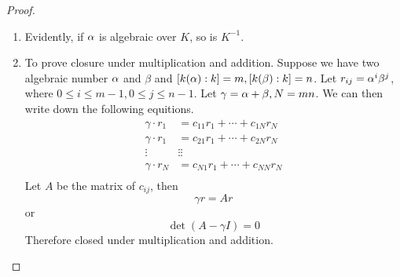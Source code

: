 \begin{proof}\mbox{}
\begin{enumerate}
	\item Evidently, if $\alpha$ is algebraic over $K$, so is $K^{-1}$.
	\item To prove closure under multiplication and addition. Suppose we have two algebraic number $\alpha$ and $\beta$ and $[k(\alpha):k]=m, [k(\beta):k]=n$. Let $r_{ij}=\alpha^i\beta^j$, where $0\le i\le m-1, 0\le j\le n-1$. Let $\gamma=\alpha+\beta, N=mn$. We can then write down the following equitions.
	\begin{align*}
	\gamma\cdot r_1 &=c_{11} r_1 + \cdots + c_{1N} r_N\\
	\gamma\cdot r_1 &=c_{21} r_1 + \cdots + c_{2N} r_N\\
	\vdots & \vdots\vdots\\
	\gamma\cdot r_N &=c_{N1} r_1 + \cdots + c_{NN} r_N\\
	\end{align*}
	Let $A$ be the matrix of $c_{ij}$, then $$\gamma r=Ar$$or $$\det(A-\gamma I) =0$$Therefore closed under multiplication and addition. 
\end{enumerate} 
\end{proof}
